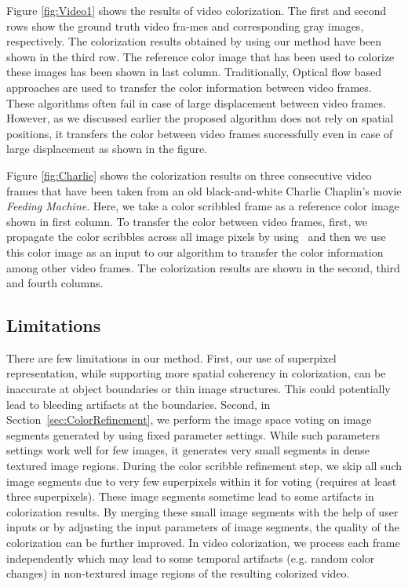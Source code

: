 \documentclass[twocolumn]{svjour3}          %
\begin{document}
Figure \ref{fig:Video1} shows the results of video colorization. The first and second rows show the ground truth video fra-mes and corresponding gray images, respectively. The colorization results obtained by using our method have been shown in the third row. The reference color image that has been used to colorize these images has been shown in last column. Traditionally, Optical flow based approaches are used to transfer the color information between video frames. These algorithms often fail in case of large displacement between video frames. However, as we discussed earlier the proposed algorithm does not rely on spatial positions, it transfers the color between video frames successfully even in case of large displacement as shown in the figure.

Figure \ref{fig:Charlie} shows the colorization results on three consecutive video frames that have been taken from an old black-and-white Charlie Chaplin's movie \emph{Feeding Machine}. Here, we take a color scribbled frame as a reference color image shown in first column. To transfer the color between video frames, first, we propagate the color scribbles across all image pixels by using~\cite{Yatziv06} and then we use this color image as an input to our algorithm to transfer the color information among other video frames. The colorization results are shown in the second, third and fourth columns.
\subsection{Limitations}
There are few limitations in our method. First, our use of superpixel representation, while supporting more spatial coherency in colorization, can be inaccurate at object boundaries or thin image structures. This could potentially lead to bleeding artifacts at the boundaries. Second, in Section~\ref{sec:ColorRefinement},  we perform the image space voting on image segments generated by using fixed parameter settings. While such parameters settings work well for few images, it generates very small segments in dense textured image regions. During the color scribble refinement step, we skip all such image segments due to very few superpixels within it for voting (requires at least three superpixels). These image segments sometime lead to some artifacts in colorization results. By merging these small image segments with the help of user inputs or by adjusting the input parameters of image segments, the quality of the colorization can be further improved.  In video colorization, we process each frame independently which may lead to some temporal artifacts (e.g. random color changes) in non-textured image regions of the resulting colorized video.
\end{document}
